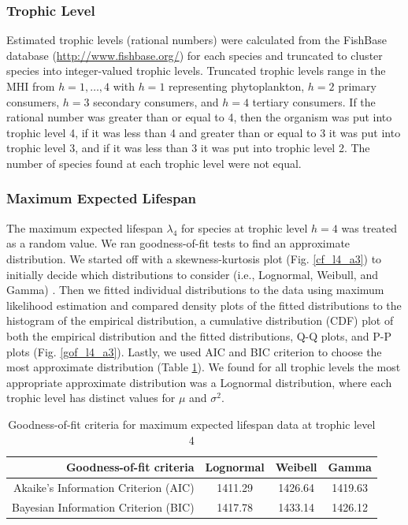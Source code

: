 \documentclass[oneside,12pt,final]{sty/ucthesis-CA2012}
\let\cite\citep                             %
\begin{document}
\begin{mainmatter}
\subsubsection{Trophic Level}
Estimated trophic levels (rational numbers) were calculated from the FishBase database (\url{http://www.fishbase.org/}) for each species and truncated to cluster species into integer-valued trophic levels. Truncated trophic levels range in the MHI from $h=1,\dots,4$ with $h=1$ representing phytoplankton, $h=2$ primary consumers, $h=3$ secondary consumers, and $h=4$ tertiary consumers. If the rational number was greater than or equal to 4, then the organism was put into trophic level 4, if it was less than 4 and greater than or equal to 3 it was put into trophic level 3, and if it was less than 3 it was put into trophic level 2. The number of species found at each trophic level were not equal.


\subsubsection{Maximum Expected Lifespan}
The maximum expected lifespan $\lambda_4$ for species at trophic level $h = 4$ was treated as a random value. We ran goodness-of-fit tests to find an approximate distribution. We started off with a skewness-kurtosis plot (Fig. \ref{cf_l4_a3}) to initially decide which distributions to consider (i.e., Lognormal, Weibull, and Gamma) \cite{fitdistrplus}. Then we fitted individual distributions to the data using maximum likelihood estimation and compared density plots of the fitted distributions to the histogram of the empirical distribution, a cumulative distribution (CDF) plot of both the empirical distribution and the fitted distributions, Q-Q plots, and P-P plots (Fig. \ref{gof_l4_a3}). Lastly, we used AIC and BIC criterion to choose the most approximate distribution (Table \ref{l4_aic_a3}). We found for all trophic levels the most appropriate approximate distribution was a Lognormal distribution, where each trophic level has distinct values for $\mu$ and $\sigma^2$. 

\begin{table}[H]
\centering
\caption{Goodness-of-fit criteria for maximum expected lifespan data at trophic level 4}
\begin{tabular}{r|c|c|c}
  \hline \small
 Goodness-of-fit criteria & Lognormal & Weibell & Gamma \\ 
   \hline
   Akaike's Information Criterion (AIC) & 1411.29 & 1426.64 & 1419.63 \\   
   Bayesian Information Criterion (BIC) & 1417.78 & 1433.14 & 1426.12 \\
   \hline
\end{tabular} 
\label{l4_aic_a3}
\end{table}


\end{mainmatter}
\end{document}
